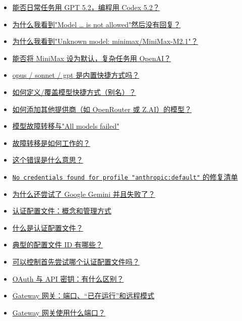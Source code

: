 \begin{itemize}
  \item \href{\#can-i-use-gpt-52-for-daily-tasks-and-codex-52-for-coding}{能否日常任务用 GPT 5.2，编程用 Codex 5.2？}
  \item \href{\#why-do-i-see-model-is-not-allowed-and-then-no-reply}{为什么我看到"Model … is not allowed"然后没有回复？}
  \item \href{\#why-do-i-see-unknown-model-minimaxminimaxm21}{为什么我看到"Unknown model: minimax/MiniMax-M2.1"？}
  \item \href{\#can-i-use-minimax-as-my-default-and-openai-for-complex-tasks}{能否将 MiniMax 设为默认，复杂任务用 OpenAI？}
  \item \href{\#are-opus-sonnet-gpt-builtin-shortcuts}{opus / sonnet / gpt 是内置快捷方式吗？}
  \item \href{\#how-do-i-defineoverride-model-shortcuts-aliases}{如何定义/覆盖模型快捷方式（别名）？}
  \item \href{\#how-do-i-add-models-from-other-providers-like-openrouter-or-zai}{如何添加其他提供商（如 OpenRouter 或 Z.AI）的模型？}
  \item \href{\#model-failover-and-all-models-failed}{模型故障转移与"All models failed"}
  \item \href{\#how-does-failover-work}{故障转移是如何工作的？}
  \item \href{\#what-does-this-error-mean}{这个错误是什么意思？}
  \item \href{\#fix-checklist-for-no-credentials-found-for-profile-anthropicdefault}{\texttt{No credentials found for profile "anthropic:default"} 的修复清单}
  \item \href{\#why-did-it-also-try-google-gemini-and-fail}{为什么还尝试了 Google Gemini 并且失败了？}
  \item \href{\#auth-profiles-what-they-are-and-how-to-manage-them}{认证配置文件：概念和管理方式}
  \item \href{\#what-is-an-auth-profile}{什么是认证配置文件？}
  \item \href{\#what-are-typical-profile-ids}{典型的配置文件 ID 有哪些？}
  \item \href{\#can-i-control-which-auth-profile-is-tried-first}{可以控制首先尝试哪个认证配置文件吗？}
  \item \href{\#oauth-vs-api-key-whats-the-difference}{OAuth 与 API 密钥：有什么区别？}
  \item \href{\#gateway-ports-already-running-and-remote-mode}{Gateway 网关：端口、“已在运行”和远程模式}
  \item \href{\#what-port-does-the-gateway-use}{Gateway 网关使用什么端口？}

\end{itemize}
